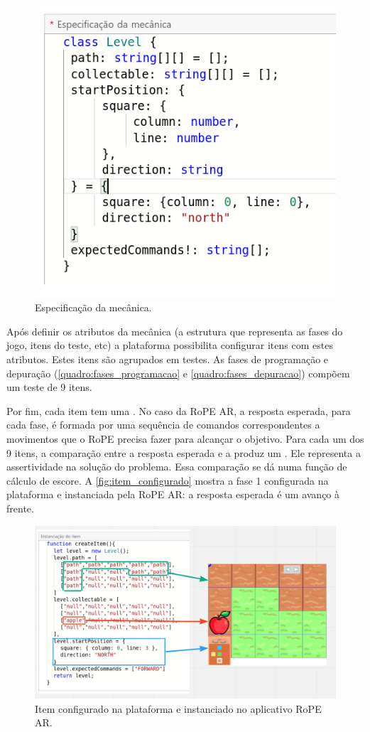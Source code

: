 \begin{figure}[!htpb]
    \centering
    \includegraphics[width=.5\linewidth,fbox]{figs/mecanica.png}
    \caption{Especificação da mecânica.}
    \sourceauthor
    \label{fig:mecanica}
\end{figure}

Após definir os atributos da mecânica (a estrutura que representa as fases do jogo, itens do teste, etc) a plataforma possibilita configurar itens com estes atributos. Estes itens são agrupados em testes. As fases de programação e depuração (\autoref{quadro:fases_programacao} e \autoref{quadro:fases_depuracao}) compõem um teste de 9 itens.

Por fim, cada item tem uma . No caso da RoPE AR, a resposta esperada, para cada fase, é formada por uma sequência de comandos correspondentes a movimentos que o RoPE precisa fazer para alcançar o objetivo. Para cada um dos 9 itens, a comparação entre a resposta esperada e a  produz um . Ele representa a assertividade na solução do problema. Essa comparação se dá numa função de cálculo de escore. A \autoref{fig:item_configurado} mostra a fase 1 configurada na plataforma e instanciada pela RoPE AR: a resposta esperada é um avanço à frente.

\begin{figure}[!htpb]
    \centering
    \includegraphics[width=.6\linewidth,fbox]{figs/item_configurado.png}
    \caption{Item configurado na plataforma e instanciado no aplicativo RoPE AR.}
    \sourceauthor
    \label{fig:item_configurado}
\end{figure}


